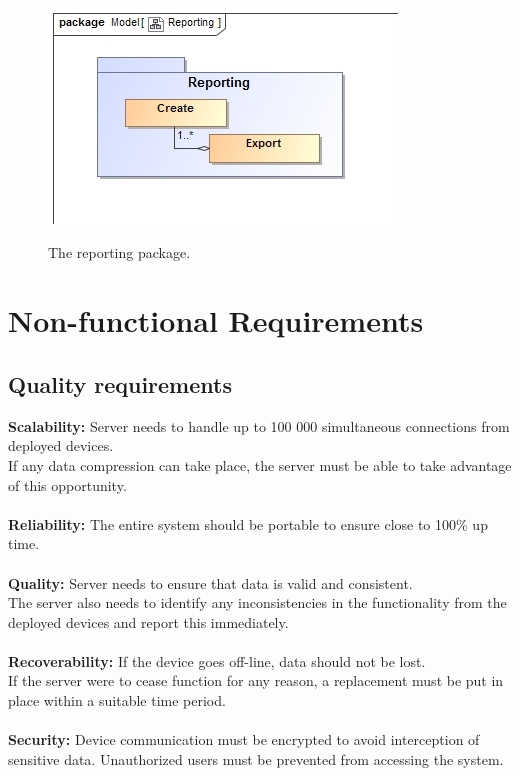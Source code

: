 \documentclass[paper=a4, fontsize=11pt]{scrartcl} %
\begin{document}
	\begin{figure}
		\includegraphics[width=\textwidth]{images/Reporting.jpg}  \\
		\caption{The reporting package.}
	\end{figure}
	\newpage
	\section{Non-functional Requirements}
	\subsection{Quality requirements}
	\textbf{Scalability:}
	Server needs to handle up to 100 000 simultaneous connections from deployed devices.\\
	If any data compression can take place, the server must be able to take advantage of this opportunity.\\
	\\\textbf{Reliability:} The entire system should be portable to ensure close to 100\% up time.\\
	\\\textbf{Quality:}
	Server needs to ensure that data is valid and consistent.\\ The server also needs to identify any inconsistencies in the functionality from the deployed devices and report this immediately.\\
	\\\textbf{Recoverability:}
	If the device goes off-line, data should not be lost.\\
	If the server were to cease function for any reason, a replacement must be put in place within a suitable time period.\\\\
	\textbf{Security:}
	Device communication must be encrypted to avoid interception of sensitive data.
	Unauthorized users must be prevented from accessing the system.\\
	
\end{document}
